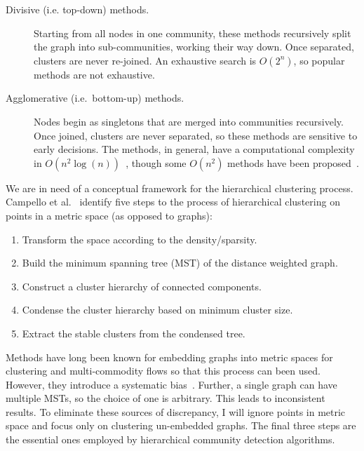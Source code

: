 \begin{description}

\item[Divisive (i.e. top-down) methods.] Starting from all nodes in one community, these methods recursively split the graph into sub-communities, working their way down. Once separated, clusters are never re-joined. An exhaustive search is $O(2^n)$, so popular methods are not exhaustive. 

\item[Agglomerative (i.e.\ bottom-up) methods.] Nodes begin as singletons that are merged into communities recursively. Once joined, clusters are never separated, so these methods are sensitive to early decisions. The methods, in general, have a computational complexity in $O(n^2 \log(n))$~\cite{rokach2005clustering}, though some $O(n^2)$ methods have been proposed~\cite{defays1977efficient, sibson1973slink, day1984efficient}.

\end{description}

We are in need of a conceptual framework for the hierarchical clustering process. Campello et al.~\cite{campello2013density} identify five steps to the process of hierarchical clustering on points in a metric space (as opposed to graphs):

\begin{enumerate}
\item Transform the space according to the density/sparsity.
\item Build the minimum spanning tree (MST) of the distance weighted graph.
\item Construct a cluster hierarchy of connected components.
\item Condense the cluster hierarchy based on minimum cluster size.
\item Extract the stable clusters from the condensed tree.
\end{enumerate}

Methods have long been known for embedding graphs into metric spaces for clustering and multi-commodity flows so that this process can been used. However, they introduce a systematic bias~\cite{linial1995geometry}. Further, a single graph can have multiple MSTs, so the choice of one is arbitrary. This leads to inconsistent results. To eliminate these sources of discrepancy, I will ignore points in metric space and focus only on clustering un-embedded graphs. The final three steps are the essential ones employed by hierarchical community detection algorithms.



